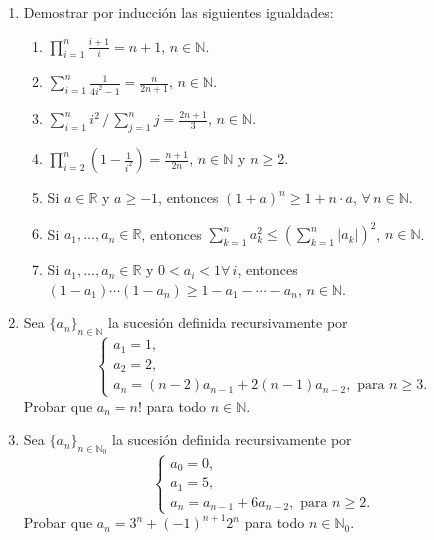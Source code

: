 \documentclass[a4paper,12pt,twoside,spanish,reqno]{amsbook}
\numberwithin{equation}{section}
\begin{document}
\begin{enumerate}[resume]
\item Demostrar por inducción  las siguientes igualdades:
  \begin{enumerate}
  \item  $\displaystyle{ \prod_{i=1}^n \frac{i+1}{i} = n+1}$, $n\in \mathbb N$.

  \item $\displaystyle{ \sum_{i=1}^n \frac{1}{4i^2-1} = \frac{n}{2n+1}}$, $n\in \mathbb N$.

  \item $\displaystyle{ \sum_{i=1}^n i^2\, /\, \sum_{j=1}^n j = \frac{2n+1}{3}}$, $n\in \mathbb N$.

  \item $\displaystyle{ \prod_{i=2}^n \left(1-\frac{1}{i^2}\right) = \frac{n+1}{2n}}$, $n\in \mathbb N$ y $ n\ge 2$.

  \item Si $a\in \mathbb R$ y $a\geq -1$, entonces $(1+a)^n\geq 1+n\cdot a$, $\forall \, n \in \mathbb N$.

  \item Si $a_1,\dots,a_n \in \mathbb R$, entonces $\displaystyle{\sum_{k=1}^n a_{k}^{2}\leq \left(\sum_{k=1}^n |a_{k}|\right)^{2}}$, $n\in \mathbb N$.


  \item Si $a_1,\dots,a_n \in \mathbb R$ y $0<a_i<1 \forall \, i$, entonces $(1-a_1)\cdots(1-a_n)\ge 1-a_1-\cdots -a_n$, $n\in \mathbb N$.

  \end{enumerate}

  \item   Sea $\{a_n\}_{n\in\mathbb N}$ la sucesión definida recursivamente por
  $$\begin{cases}
  a_1=1, \\a_2=2, \\a_{n} = (n-2)a_{n-1}+2(n-1)a_{n-2}, \text{ para $n\geq 3$}.
  \end{cases}$$
  Probar que $a_n=n!$ para todo $n\in \mathbb N$.

  \item   Sea $\{a_n\}_{n\in\mathbb N_0}$ la sucesión definida recursivamente por
  $$\begin{cases}
     a_0=0, \\a_1=5, \\a_{n} = a_{n-1}+6a_{n-2}, \text{ para $n\geq 2$}.
    \end{cases}$$
  Probar que $a_n=3^n + (-1)^{n+1}2^n$ para todo $n\in \mathbb N_0$.


\end{enumerate}
\end{document}
